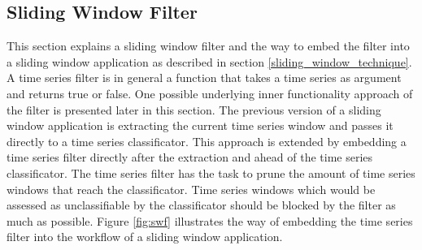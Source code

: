\subsection{Sliding Window Filter} \label{sliding_window_filter}
This section explains a sliding window filter and the way to embed the filter into a sliding window application as
described in section \ref{sliding_window_technique}. A time series filter is in general a function that takes a time
series as argument and returns true or false. One possible underlying inner functionality approach of the filter is
presented later in this section. The previous version of a sliding window application is extracting the current time
series window and passes it directly to a time series classificator. This approach is extended by embedding a time
series filter directly after the extraction and ahead of the time series classificator. The time series filter has the
task to prune the amount of time series windows that reach the classificator. Time series windows which would be
assessed as unclassifiable by the classificator should be blocked by the filter as much as possible. Figure
\ref{fig:swf} illustrates the way of embedding the time series filter into the workflow of a sliding window application.
\clearpage
